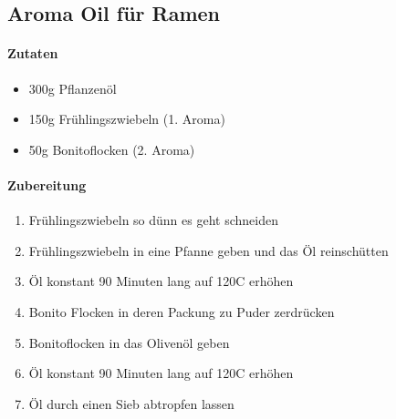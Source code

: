 \newpage
\subsection{Aroma Oil für Ramen}
\paragraph{Zutaten}
\begin{itemize}[noitemsep]
	\item 300g Pflanzenöl 
	\item 150g Frühlingszwiebeln (1. Aroma)
	\item 50g Bonitoflocken (2. Aroma)  
\end{itemize}
\paragraph{Zubereitung}
\begin{enumerate}[noitemsep]
	\item Frühlingszwiebeln so dünn es geht schneiden
	\item Frühlingszwiebeln in eine Pfanne geben und das Öl reinschütten 
	\item Öl konstant 90 Minuten lang auf 120\textdegree C erhöhen 
	\vspace{0.5cm}
	\item Bonito Flocken in deren Packung zu Puder zerdrücken 
	\item Bonitoflocken in das Olivenöl geben 
	\item Öl konstant 90 Minuten lang auf 120\textdegree C erhöhen 
	\item Öl durch einen Sieb abtropfen lassen 
\end{enumerate}
